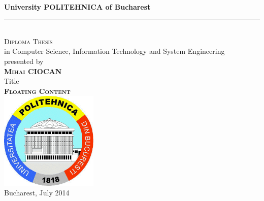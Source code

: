 \begin{titlepage}
\begin{center}

~\\[5mm]
{\Large {\bf University POLITEHNICA of Bucharest}}\\[5mm]
\smallskip\hrule\smallskip
~\\[15mm]

{\Large \textsc{Diploma Thesis}} \\[15mm]

{\large in Computer Science, Information Technology and System Engineering} \\[20mm]

{\large presented by} \\[2mm]

{\Large \textsc{{\bf Mihai CIOCAN}}} \\[20mm]

{\large Title} \\[2mm]
{\Large \textsc{{\bf Floating Content}}} \\[25mm]

\centering
{\includegraphics[width=0.35\textwidth]{./img/upb}}\\[5mm]

{\large Bucharest, July 2014}


\end{center}
\end{titlepage}
